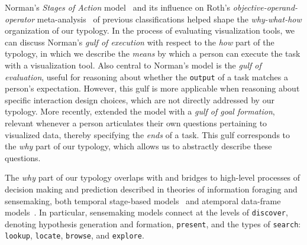 Norman's {\it Stages of Action} model~\cite{Norman1988} and its influence on Roth's {\it objective-operand-operator} meta-analysis~\cite{Roth2012a} of previous classifications helped shape the {\it why-what-how} organization of our typology.
In the process of evaluating visualization tools, we can discuss Norman's {\it gulf of execution} with respect to the {\it how} part of the typology, in which we describe the {\it means} by which a person can execute the task with a visualization tool.
Also central to Norman's model is the {\it gulf of evaluation}, useful for reasoning about whether the {\tt output} of a task matches a person's expectation.
However, this gulf is more applicable when reasoning about specific interaction design choices, which are not directly addressed by our typology.
More recently, \citet{Lam2008} extended the model with a {\it gulf of goal formation}, relevant whenever a person articulates their own questions pertaining to visualized data, thereby specifying the {\it ends} of a task.
This gulf corresponds to the {\it why} part of our typology, which allows us to abstractly describe these questions.

The {\it why} part of our typology overlaps with and bridges to high-level processes of decision making and prediction described in theories of information foraging and sensemaking, both temporal stage-based models~\cite{Card1999,Pirolli2005} and atemporal data-frame models~\cite{Klein2006}.
In particular, sensemaking models connect at the levels of {\tt discover}, denoting hypothesis generation and formation, {\tt present}, and the types of {\tt search}: {\tt lookup}, {\tt locate}, {\tt browse}, and {\tt explore}.

